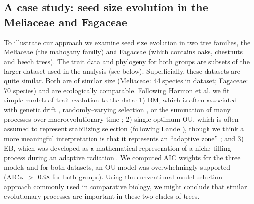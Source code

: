 \documentclass[a4paper,12pt]{article}
\begin{document}
\subsection{A case study: seed size evolution in the Meliaceae and Fagaceae }
To illustrate our approach we examine seed size evolution in two tree families, the Meliaceae (the mahogany family) and Fagaceae (which contains oaks, chestnuts and beech trees). The trait data and phylogeny for both groups are subsets of the larger dataset used in the analysis (see below). Superficially, these datasets are quite similar. Both are of similar size (Meliaceae: 44 species in dataset; Fagaceae: 70 species) and are ecologically comparable. Following Harmon et al. \citep{Harmon2010} we fit simple models of trait evolution to the data: 1) BM, which is often associated with genetic drift \citep{Lande1976, Felsenstein1988, Lynch1990, HansenMartins1996}, randomly--varying selection \citep{Felsenstein1973}, or the summation of many processes over macroevolutionary time \citep{HansenMartins1996, Uyeda2011, PennellPE}; 2) single optimum OU, which is often assumed to represent stabilizing selection (following Lande \citep{Lande1976}), though we think a more meaningful interpretation is that it represents an ``adaptive zone'' \citep{Hansen2012book, PennellHarmon}; and 3) EB, which was developed as a mathematical represenation of a niche--filling process during an adaptive radiation \citep{Harmon2010, SlaterPennell}. We computed AIC weights \citep{aicweight} for the three models and for both datasets, an OU model was overwhelmingly supported (AICw $>$ 0.98 for both groups). Using the conventional model selection approach commonly used in comparative biology, we might conclude that similar evolutionary processes are important in these two clades of trees.
\end{document}
